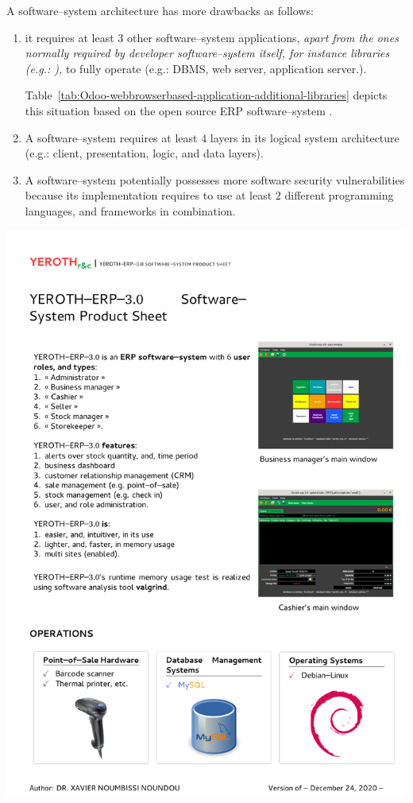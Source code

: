 A \webbrowserbased software--system
architecture has more drawbacks as
follows:

\begin{enumerate}[1.]
	\item it requires at least $3$ other 
		software--system applications, \emph{apart from
		the ones normally required by developer
		software--system itself, for instance libraries (e.g.:
		\logFourJ),} to fully operate
		(e.g.: DBMS, web server, application server.).
		
		Table~\ref{tab:Odoo-webbrowserbased-application-additional-libraries}
		depicts this situation based on the open source ERP
		software--system \Odoo.		
				
	\item A \webbrowserbased software--system
		requires at least $4$ layers in
		its logical system architecture
		(e.g.: client, presentation, logic,
		and data layers).

	\item A \webbrowserbased software--system
		potentially possesses more software
		security vulnerabilities because its
		implementation requires to use at least
		$2$ different programming languages, and
		frameworks in combination.
\end{enumerate}

\newpage

\includegraphics[scale=0.9]{../yeroth-erp-3-0-info-english.pdf}

\newpage
